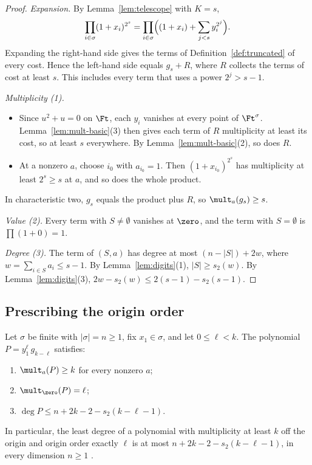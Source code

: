 \begin{proof}
\emph{Expansion.} By Lemma~\ref{lem:telescope} with \(K=s\),
\[
 \prod_{i\in\sigma}(1+x_i)^{2^s}=\prod_{i\in\sigma}\Bigl((1+x_i)+\sum_{j<s}y_i^{2^j}\Bigr).
\]
Expanding the right-hand side gives the terms of Definition~\ref{def:truncated}
of every cost. Hence the left-hand side equals \(g_s+R\), where \(R\) collects the
terms of cost at least \(s\). This includes every term that uses a power
\(2^j>s-1\).

\emph{Multiplicity (1).}
\begin{itemize}
 \item Since \(u^2+u=0\) on \(\Ft\), each \(y_i\) vanishes at every point of
 \(\Ft^\sigma\). Lemma~\ref{lem:mult-basic}(3) then gives each term of \(R\)
 multiplicity at least its cost, so at least \(s\) everywhere. By
 Lemma~\ref{lem:mult-basic}(2), so does \(R\).
 \item At a nonzero \(a\), choose \(i_0\) with \(a_{i_0}=1\). Then
 \((1+x_{i_0})^{2^s}\) has multiplicity at least \(2^s\ge s\) at \(a\), and so does
 the whole product.
\end{itemize}
In characteristic two, \(g_s\) equals the product plus \(R\), so
\(\mult_a(g_s)\ge s\).

\emph{Value (2).} Every term with \(S\ne\emptyset\) vanishes at \(\zero\), and the term
with \(S=\emptyset\) is \(\prod(1+0)=1\).

\emph{Degree (3).} The term of \((S,a)\) has degree at most
\((n-|S|)+2w\), where \(w=\sum_{i\in S}a_i\le s-1\). By
Lemma~\ref{lem:digits}(1), \(|S|\ge s_2(w)\). By Lemma~\ref{lem:digits}(3),
\(2w-s_2(w)\le2(s-1)-s_2(s-1)\).
\end{proof}

\subsection{Prescribing the origin order}

\begin{theorem}\label{thm:per-order}
Let \(\sigma\) be finite with \(|\sigma|=n\ge1\), fix \(x_1\in\sigma\), and let
\(0\le\ell<k\). The polynomial \(P=y_1^{\ell}\,g_{k-\ell}\) satisfies:
\begin{enumerate}
 \item \(\mult_a(P)\ge k\) for every nonzero \(a\);
 \item \(\mult_{\zero}(P)=\ell\);
 \item \(\deg P\le n+2k-2-s_2(k-\ell-1)\).
\end{enumerate}
In particular, the least degree of a polynomial with multiplicity at least \(k\)
off the origin and origin order exactly \(\ell\) is at most
\(n+2k-2-s_2(k-\ell-1)\), in every dimension \(n\ge1\)
.
\end{theorem}

